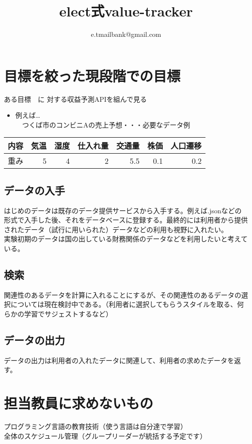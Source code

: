 \documentclass{scrartcl}
\author{e.tmailbank@gmail.com}
\date{}
\title{elect式value-tracker}
\begin{document}
\maketitle
\section{目標を絞った現段階での目標}
\label{sec:orgda73c7d}
ある目標　に 対する収益予測APIを組んで見る\\
\begin{itemize}
\item 例えば\ldots{}\\
　つくば市のコンビニAの売上予想・・・必要なデータ例\\
\end{itemize}
\begin{center}
\begin{tabular}{lrrrrrr}
\hline
内容 & 気温 & 湿度 & 仕入れ量 & 交通量 & 株価 & 人口遷移\\
\hline
重み & 5 & 4 & 2 & 5.5 & 0.1 & 0.2\\
\hline
\end{tabular}
\end{center}
\subsection{データの入手}
\label{sec:org335236b}
はじめのデータは既存のデータ提供サービスから入手する。例えば.jsonなどの形式で入手した後、それをデータベースに登録する。最終的には利用者から提供されたデータ（試行に用いられた）データなどの利用も視野に入れたい。\\
実験初期のデータは国の出している財務関係のデータなどを利用したいと考えている。\\
\subsection{検索}
\label{sec:org35d5745}
関連性のあるデータを計算に入れることにするが、その関連性のあるデータの選択については現在検討中である。（利用者に選択してもらうスタイルを取る、何らかの学習でサジェストするなど）\\
\subsection{データの出力}
\label{sec:orgfacbbbd}
データの出力は利用者の入れたデータに関連して、利用者の求めたデータを返す。\\
\section{担当教員に求めないもの}
\label{sec:org713bcc8}
プログラミング言語の教育技術（使う言語は自分達で学習）\\
全体のスケジュール管理（グループリーダーが統括する予定です）\\
\end{document}
